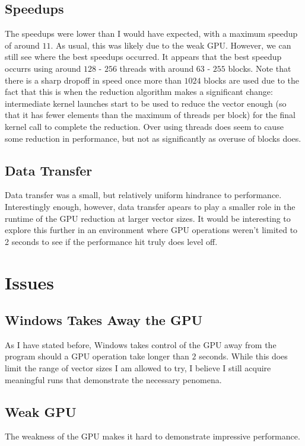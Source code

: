 \documentclass{article}
\begin{document}
\subsection{Speedups}
The speedups were lower than I would have expected, with a maximum speedup of around $11$. As usual, this was likely due to the weak GPU. However, we can still see where the best speedups occurred. It appears that the best speedup occurrs using around $128$ - $256$ threads with around $63$ - $255$ blocks. Note that there is a sharp dropoff in speed once more than $1024$ blocks are used due to the fact that this is when the reduction algorithm makes a significant change: intermediate kernel launches start to be used to reduce the vector enough (so that it has fewer elements than the maximum of threads per block) for the final kernel call to complete the reduction. Over using threads does seem to cause some reduction in performance, but not as significantly as overuse of blocks does.

\subsection{Data Transfer}
Data transfer was a small, but relatively uniform hindrance to performance. Interestingly enough, however, data transfer apears to play a smaller role in the runtime of the GPU reduction at larger vector sizes. It would be interesting to explore this further in an environment where GPU operations weren't limited to 2 seconds to see if the performance hit truly does level off.

\section{Issues}
\subsection{Windows Takes Away the GPU}
As I have stated before, Windows takes control of the GPU away from the program should a GPU operation take longer than $2$ seconds. While this does limit the range of vector sizes I am allowed to try, I believe I still acquire meaningful runs that demonstrate the necessary penomena.

\subsection{Weak GPU}
The weakness of the GPU makes it hard to demonstrate impressive performance.
\end{document}
